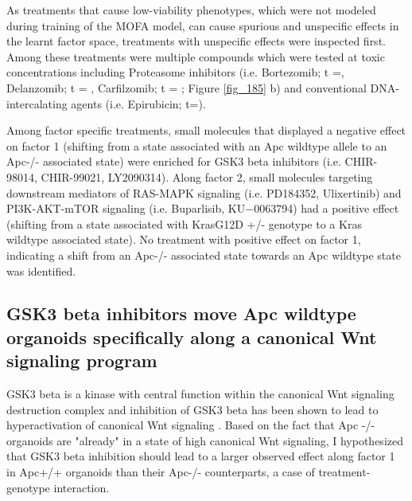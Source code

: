 \begin{flushleft}
As treatments that cause low-viability phenotypes, which were not modeled during training of the MOFA model, can cause spurious and unspecific effects in the learnt factor space, treatments with unspecific effects were inspected first. Among these treatments were multiple compounds which were tested at toxic concentrations including Proteasome inhibitors (i.e. Bortezomib; t =, Delanzomib; t = , Carfilzomib; t = ; Figure \ref{fig_185} b) and conventional DNA-intercalating agents (i.e. Epirubicin; t=). 
\par

Among factor specific treatments, small molecules that displayed a negative effect on factor 1 (shifting from a state associated with an Apc wildtype allele to an Apc-/- associated state) were enriched for GSK3 beta inhibitors (i.e. CHIR-98014, CHIR-99021, LY2090314). Along factor 2, small molecules targeting downstream mediators of RAS-MAPK signaling (i.e.  PD184352, Ulixertinib) and PI3K-AKT-mTOR signaling (i.e. Buparlisib, KU−0063794) had a positive effect (shifting from a state associated with KrasG12D +/- genotype to a Kras wildtype associated state). No treatment with positive effect on factor 1, indicating a shift from an Apc-/- associated state towards an Apc wildtype state was identified. 

\subsection{GSK3 beta inhibitors move Apc wildtype organoids specifically along a canonical Wnt signaling program}

GSK3 beta is a kinase with central function within the canonical Wnt signaling destruction complex \citep{stamos} and inhibition of GSK3 beta has been shown to lead to hyperactivation of canonical Wnt signaling \citep{Stambolic}. Based on the fact that Apc -/- organoids are "already" in a state of high canonical Wnt signaling, I hypothesized that GSK3 beta inhibition should lead to a larger observed effect along factor 1 in Apc+/+ organoids than their Apc-/- counterparts, a case of treatment-genotype interaction. 


\end{flushleft}
